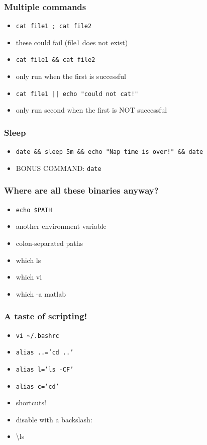 \documentclass[%
        hyperref={%
                pdfauthor={Zakariyya Mughal},%
                pdfpagemode={None},pdfpagelayout={SinglePage}}%
        xcolor={x11names},%
]{beamer}
\begin{document}
\begin{frame}
	\frametitle{Multiple commands}
	\begin{itemize}
		\item \texttt{cat file1 ; cat file2}
		\pause\item these could fail (file1 does not exist)

		\pause\item \texttt{cat file1 \&\& cat file2}
		\pause\item only run when the first is successful

		\pause\item \texttt{cat file1 || echo "could not cat!"}
		\pause\item only run second when the first is NOT successful
	\end{itemize}
\end{frame}
\begin{frame}
	\frametitle{Sleep}
	\begin{itemize}
		\item \texttt{date \&\& sleep 5m \&\& echo "Nap
		time is over!" \&\& date }
		\pause\item BONUS COMMAND: \texttt{date}
	\end{itemize}
\end{frame}
\begin{frame}
	\frametitle{Where are all these binaries anyway?}
	\begin{itemize}
		\item \texttt{echo \$PATH}
		\item another environment variable
		\pause\item colon-separated paths
		\item which ls
		\item which vi
		\item which -a matlab
	\end{itemize}
\end{frame}
\begin{frame}
	\frametitle{A taste of scripting!}
	\begin{itemize}
		\item \texttt{vi \textasciitilde/.bashrc}
		\item \texttt{alias ..='cd ..'}
		\item \texttt{alias l='ls -CF'}
		\item \texttt{alias c='cd'}
		\item shortcuts!
		\pause\item disable with a backslash:
		\item \textbackslash{}ls
	\end{itemize}
\end{frame}
\end{document}

